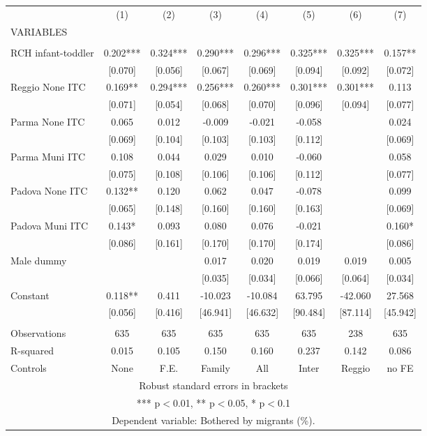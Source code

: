 \begin{tabular}{lccccccc} \hline
 & (1) & (2) & (3) & (4) & (5) & (6) & (7) \\
VARIABLES &  &  &  &  &  &  &  \\ \hline
 &  &  &  &  &  &  &  \\
RCH infant-toddler & 0.202*** & 0.324*** & 0.290*** & 0.296*** & 0.325*** & 0.325*** & 0.157** \\
 & [0.070] & [0.056] & [0.067] & [0.069] & [0.094] & [0.092] & [0.072] \\
Reggio None ITC & 0.169** & 0.294*** & 0.256*** & 0.260*** & 0.301*** & 0.301*** & 0.113 \\
 & [0.071] & [0.054] & [0.068] & [0.070] & [0.096] & [0.094] & [0.077] \\
Parma None ITC & 0.065 & 0.012 & -0.009 & -0.021 & -0.058 &  & 0.024 \\
 & [0.069] & [0.104] & [0.103] & [0.103] & [0.112] &  & [0.069] \\
Parma Muni ITC & 0.108 & 0.044 & 0.029 & 0.010 & -0.060 &  & 0.058 \\
 & [0.075] & [0.108] & [0.106] & [0.106] & [0.112] &  & [0.077] \\
Padova None ITC & 0.132** & 0.120 & 0.062 & 0.047 & -0.078 &  & 0.099 \\
 & [0.065] & [0.148] & [0.160] & [0.160] & [0.163] &  & [0.069] \\
Padova Muni ITC & 0.143* & 0.093 & 0.080 & 0.076 & -0.021 &  & 0.160* \\
 & [0.086] & [0.161] & [0.170] & [0.170] & [0.174] &  & [0.086] \\
Male dummy &  &  & 0.017 & 0.020 & 0.019 & 0.019 & 0.005 \\
 &  &  & [0.035] & [0.034] & [0.066] & [0.064] & [0.034] \\
Constant & 0.118** & 0.411 & -10.023 & -10.084 & 63.795 & -42.060 & 27.568 \\
 & [0.056] & [0.416] & [46.941] & [46.632] & [90.484] & [87.114] & [45.942] \\
 &  &  &  &  &  &  &  \\
Observations & 635 & 635 & 635 & 635 & 635 & 238 & 635 \\
R-squared & 0.015 & 0.105 & 0.150 & 0.160 & 0.237 & 0.142 & 0.086 \\
 Controls & None & F.E. & Family & All & Inter & Reggio & no FE \\ \hline
\multicolumn{8}{c}{ Robust standard errors in brackets} \\
\multicolumn{8}{c}{ *** p$<$0.01, ** p$<$0.05, * p$<$0.1} \\
\multicolumn{8}{c}{ Dependent variable: Bothered by migrants (\%).} \\
\end{tabular}
